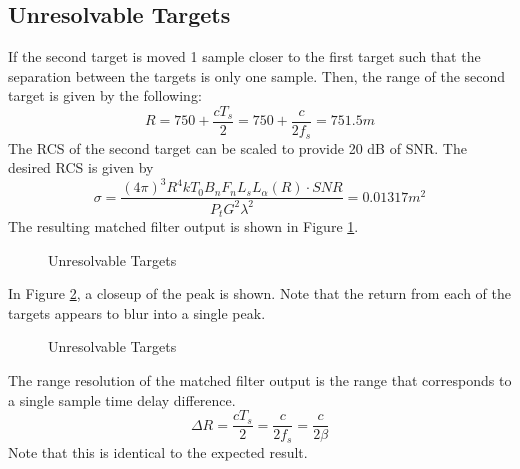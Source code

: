 \documentclass[12pt,letterpaper]{article}
\begin{document}
\subsection{Unresolvable Targets}
If the second target is moved 1 sample closer to the first target such that the separation between the targets is only one sample. Then, the range of the second target is given by the following:
\begin{equation}
R = 750 + \frac{cT_s}{2} = 750 + \frac{c}{2f_s} = 751.5 m
\end{equation}
The RCS of the second target can be scaled to provide 20 dB of SNR. The desired RCS is given by
\begin{equation}
\sigma = \frac{(4\pi)^3 R^4 k T_0 B_n F_n L_s L_\alpha(R)\cdot SNR}{P_t G^2 \lambda^2} = 0.01317  m^2
\end{equation}
The resulting matched filter output is shown in Figure \ref{Unresolvable Full}.
\begin{figure}[H]
\caption{Unresolvable Targets}
\label{Unresolvable Full}
\end{figure}
\noindent
In Figure \ref{Unresolvable Peak}, a closeup of the peak is shown. Note that the return from each of the targets appears to blur into a single peak.
\begin{figure}[H]
\caption{Unresolvable Targets}
\label{Unresolvable Peak}
\end{figure}
\noindent
The range resolution of the matched filter output is the range that corresponds to a single sample time delay difference.
\begin{equation}
\Delta R = \frac{cT_s}{2} = \frac{c}{2f_s} = \frac{c}{2\beta}
\end{equation}
Note that this is identical to the expected result.
\end{document}
